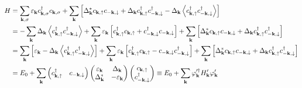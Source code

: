 \begin{equation}
\begin{split}
    H &= \sum_{\bf{k},\sigma} \varepsilon_{\bf{k}} c_{\bf{k},\sigma}^{\dagger} c_{\bf{k},\sigma} + \sum_{\bf{k}} \left[ \Delta_{\bf{k}}^*c_{\bf{k},\uparrow} c_{\bf{-k},\downarrow} + \Delta_{\bf{k}}c_{\bf{k},\uparrow}^{\dagger} c_{\bf{-k},\downarrow}^{\dagger} - \Delta_{\bf{k}}\left<c_{\bf{k},\uparrow}^{\dagger} c_{-\bf{k},\downarrow}^{\dagger} \right> \right]
    \\
    &= -\sum_{\bf{k}} \Delta_{\bf{k}}\left<c_{\bf{k},\uparrow}^{\dagger} c_{-\bf{k},\downarrow}^{\dagger} \right> + \sum_{\bf{k}} \varepsilon_{\bf{k}} \left[c_{\bf{k},\uparrow}^{\dagger} c_{\bf{k},\uparrow} + c_{-\bf{k},\downarrow}^{\dagger} c_{-\bf{k},\downarrow} \right] + \sum_{\bf{k}} \left[ \Delta_{\bf{k}}^*c_{\bf{k},\uparrow} c_{\bf{-k},\downarrow} + \Delta_{\bf{k}}c_{\bf{k},\uparrow}^{\dagger} c_{\bf{-k},\downarrow}^{\dagger} \right]
    \\
    &=
    \sum_{\bf{k}} \left[ \varepsilon_{\mathbf{k}} - \Delta_{\bf{k}}\left<c_{\bf{k},\uparrow}^{\dagger} c_{-\bf{k},\downarrow}^{\dagger} \right> \right] + \sum_{\bf{k}} \varepsilon_{\bf{k}} \left[c_{\bf{k},\uparrow}^{\dagger} c_{\bf{k},\uparrow} - c_{-\bf{k},\downarrow} c_{-\bf{k},\downarrow}^{\dagger}  \right] + \sum_{\bf{k}} \left[ \Delta_{\bf{k}}^*c_{\bf{k},\uparrow} c_{\bf{-k},\downarrow} + \Delta_{\bf{k}}c_{\bf{k},\uparrow}^{\dagger} c_{\bf{-k},\downarrow}^{\dagger} \right]
    \\
    &= E_0 + \sum_{\bf{k}}
    \begin{pmatrix}
        c_{\bf{k},\uparrow}^{\dagger} & c_{-\bf{k},\downarrow}
    \end{pmatrix}
    \begin{pmatrix}
        \varepsilon_{\bf{k}} & \Delta_{\bf{k}}\\
        \Delta_{\bf{k}}^* & -\varepsilon_{\bf{k}} 
    \end{pmatrix}
    \begin{pmatrix}
        c_{\bf{k},\uparrow} \\ c_{-\bf{k},\downarrow}^{\dagger}
    \end{pmatrix}
    \equiv E_0 + \sum_{\mathbf{k}}\varphi_{\mathbf{k}}'^{\dagger}H_{\mathbf{k}}'\varphi_{\mathbf{k}}'
\end{split}
\label{Ham-2-3}
\end{equation}

